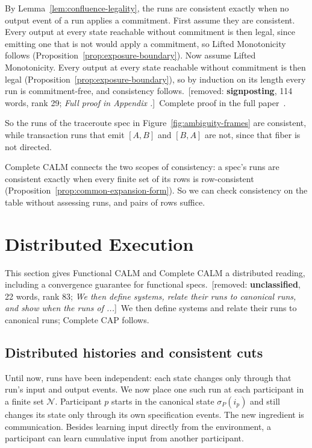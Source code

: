 \documentclass[sigconf]{cidr-2027}
\makeatletter
\theoremstyle{remark}
\newcommand{\commitment}{commitment\xspace}
\newcommand{\fullproof}{Complete proof in the full paper~\cite{hellerstein2026completecalmfull}.}
\renewenvironment{proof}[1][\proofname]{\par
  \pushQED{\qed}\normalfont\topsep2\p@\relax
  \trivlist\item[\@proofindent\hskip\labelsep{\@proofnamefont #1\@addpunct{.}}]\ignorespaces
}{\popQED\endtrivlist\@endpefalse}
\newcommand{\removednote}[1]{{\color{cutred}\footnotesize\,[removed: #1]\,}}
\makeatother
\begin{document}
\begin{proof}[Proof sketch]
By Lemma~\ref{lem:confluence-legality}, the runs are consistent exactly when
no output event of a run applies a \commitment. First assume they are
consistent. \textcolor{newblue}{Every output at every state reachable without \commitment is then
legal, since emitting one that is not would apply a \commitment, so Lifted
Monotonicity follows (Proposition~\ref{prop:exposure-boundary}).} Now assume
Lifted Monotonicity. Every output at every state reachable without
\commitment is then legal (Proposition~\ref{prop:exposure-boundary}), so by
induction on its length every run is \commitment-free, and consistency
follows. \removednote{\textbf{signposting}, 114 words, rank 29; \textit{Full proof in Appendix .}} \textcolor{newblue}{\fullproof}
\end{proof}

\textcolor{newblue}{So the runs of the traceroute spec in Figure~\ref{fig:ambiguity-frames} are
consistent, while transaction runs that emit $[A,B]$ and $[B,A]$ are not, since
that fiber is not directed.}

\textcolor{newblue}{Complete CALM connects the two scopes of consistency: a spec's runs are
consistent exactly when every finite set of its rows is row-consistent
(Proposition~\ref{prop:common-expansion-form}).} \textcolor{newblue}{So we can check consistency
on the table without assessing runs, and pairs of rows suffice.}


\section{Distributed Execution}
\label{sec:distributed-execution}

\textcolor{newblue}{This section gives Functional CALM and Complete CALM a distributed reading,
including a convergence guarantee for functional specs.} \removednote{\textbf{unclassified}, 22 words, rank 83; \textit{We then define systems, relate their runs to canonical runs, and show when the runs of ...}} \textcolor{newblue}{We then define
systems and relate their runs to canonical runs; Complete CAP follows.}

\subsection{Distributed histories and consistent cuts}
\label{sec:histories}
\label{sec:distributed-consistency}

Until now, runs have been independent: each state changes only through that
run's input and output events. We now place one such run at each participant in
a finite set $\mathcal N$. Participant $p$ starts in the canonical state
$\sigma_P(i_p)$ and still changes its state only through its own specification
events. The new ingredient is communication. Besides learning input directly
from the environment, a participant can learn cumulative input from another
participant.
\end{document}
